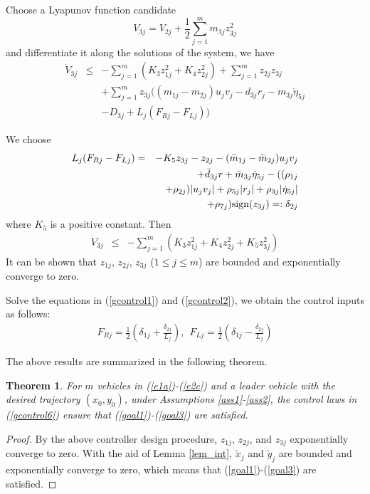 \documentclass[letterpaper, 10 pt, conference]{ieeeconf}  %
\newtheorem{theorem}{Theorem}
\begin{document}
Choose a Lyapunov function candidate
$$V_{3j}=V_{2j}+\frac{1}{2}\sum^m_{j=1}m_{3j}z^2_{3j}$$
and differentiate it along the solutions of the system, we have
\begin{eqnarray*}
\dot{V}_{3j}&\leq & -\sum^m_{j=1}(K_{3}z^2_{1j}+K_{4}z^2_{2j})+\sum^m_{j=1}z_{2j}z_{3j}\\
&&+\sum^m_{j=1}z_{3j}((m_{1j}-m_{2j})u_jv_j-d_{3j}r_j-m_{3j}\dot{\eta}_{5j}\nonumber\\
&&-D_{3j}+L_j(F_{Rj}-F_{Lj}))
\end{eqnarray*}

We choose
\begin{eqnarray}
L_j(F_{Rj}-F_{Lj})&=&-K_5z_{3j}-z_{2j}-(\bar{m}_{1j}-\bar{m}_{2j})u_jv_j\nonumber\\
&&+\bar{d}_{3j}r+\bar{m}_{3j}\dot{{\eta}}_{5j}-((\rho_{1j}\nonumber\\
&&+\rho_{2j})|u_jv_j|+\rho_{5j}|r_j|+\rho_{3j}|\dot{{\eta}}_{5j}|\nonumber\\
&&+\rho_{7j}){\rm sign}(z_{3j})=:\delta_{2j}\label{gcontrol2}
\end{eqnarray}
where $K_5$ is a positive constant. Then
\begin{eqnarray*}
\dot{V}_{3j}&\leq &
-\sum^m_{j=1}(K_{3}z^2_{1j}+K_{4}z^2_{2j}+K_5z^2_{3j})
\end{eqnarray*}
It can be shown
that  $z_{1j}$, $z_{2j}$, $z_{3j}$ ($1\leq j\leq m$) are bounded and
exponentially converge to zero.

Solve the equations in (\ref{gcontrol1}) and (\ref{gcontrol2}), we
obtain the control inputs as follows:
\begin{eqnarray}
F_{Rj}=\frac{1}{2}\left(\delta_{1j}+\frac{\delta_{2j}}{L_j} \right),~~
F_{Lj}=\frac{1}{2}\left(\delta_{1j}-\frac{\delta_{2j}}{L_j}
\right)\label{gcontrol6}
\end{eqnarray}

The above results are summarized in the following theorem.

\begin{theorem}
For $m$ vehicles  in (\ref{e1a})-(\ref{e2c}) and a leader vehicle with the desired trajectory
$(x_0,y_0)$, under Assumptions \ref{ass1}-\ref{ass2}, the control
laws in (\ref{gcontrol6}) ensure that (\ref{goal1})-(\ref{goal3}) are satisfied.
\label{gthe1}
\end{theorem}

\begin{proof}
By the above controller design procedure, $z_{1j}$, $z_{2j}$, and $z_{3j}$ exponentially converge to zero. With the aid of Lemma \ref{lem_int}, $\tilde{x}_j$ and $\tilde{y}_j$ are bounded and exponentially converge to zero,   
which
means that (\ref{goal1})-(\ref{goal3}) are satisfied.
\end{proof}
\end{document}
